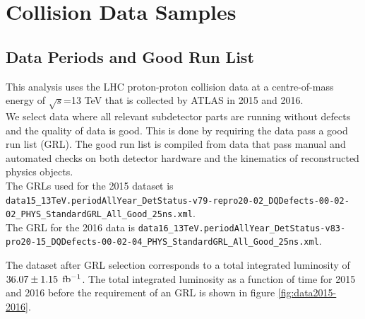\chapter{Collision Data Samples}
\label{chap:data}
\section{Data Periods and Good Run List}
\label{EventSel:GRL}

\indent This analysis uses the LHC proton-proton collision data at a centre-of-mass energy of $\sqrt{s}$=13 TeV that is collected by ATLAS in 2015 and 2016. \\

\indent We select data where all relevant subdetector parts are running without defects and the quality of data is good.  This is done by requiring the data pass a good run list (GRL).  The good run list is compiled from data that pass manual and automated checks on both detector hardware and the kinematics of reconstructed physics objects.  \\

\indent The GRLs used for the 2015 dataset is {\tt \scriptsize data15\_13TeV.periodAllYear\_DetStatus-v79-repro20-02\_DQDefects-00-02-02\_PHYS\_StandardGRL\_All\_Good\_25ns.xml}.  \\
\indent The GRL for the 2016 data is {\tt \scriptsize data16\_13TeV.periodAllYear\_DetStatus-v83-pro20-15\_DQDefects-00-02-04\_PHYS\_StandardGRL\_All\_Good\_25ns.xml}.

\indent The dataset after GRL selection corresponds to a total integrated luminosity of $36.07 \pm 1.15$ $\mbox{fb$^{-1}$}$.  The total integrated luminosity as a function of time for 2015 and 2016 before the requirement of an GRL is shown in figure \ref{fig:data2015-2016}.\\

